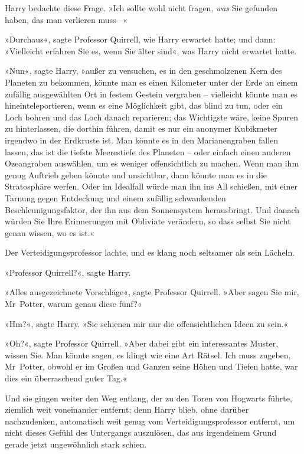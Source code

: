 {Harry bedachte diese Frage. »Ich sollte wohl nicht fragen, \emph{was} Sie gefunden haben, das man verlieren muss --«

»Durchaus«, sagte Professor Quirrell, wie Harry erwartet hatte; und dann: »Vielleicht erfahren Sie es, wenn Sie älter sind«, was Harry nicht erwartet hatte.

»Nun«, sagte Harry, »außer zu versuchen, es in den geschmolzenen Kern des Planeten zu bekommen, könnte man es einen Kilometer unter der Erde an einem zufällig ausgewählten Ort in festem Gestein vergraben -- vielleicht könnte man es hineinteleportieren, wenn es eine Möglichkeit gibt, das blind zu tun, oder ein Loch bohren und das Loch danach reparieren; das Wichtigste wäre, keine Spuren zu hinterlassen, die dorthin führen, damit es nur ein anonymer Kubikmeter irgendwo in der Erdkruste ist. Man könnte es in den Marianengraben fallen lassen, das ist die tiefste Meerestiefe des Planeten -- oder einfach einen anderen Ozeangraben auswählen, um es weniger offensichtlich zu machen. Wenn man ihm genug Auftrieb geben könnte und unsichtbar, dann könnte man es in die Stratosphäre werfen. Oder im Idealfall würde man ihn ins All schießen, mit einer Tarnung gegen Entdeckung und einem zufällig schwankenden Beschleunigungsfaktor, der ihn aus dem Sonnensystem herausbringt. Und danach würden Sie Ihre Erinnerungen mit Obliviate verändern, so dass selbst Sie nicht genau wissen, wo es ist.«

Der Verteidigungsprofessor lachte, und es klang noch seltsamer als sein Lächeln.

»Professor Quirrell?«, sagte Harry.

»Alles ausgezeichnete Vorschläge«, sagte Professor Quirrell. »Aber sagen Sie mir, Mr~Potter, warum genau diese fünf?«

»Hm?«, sagte Harry. »Sie schienen mir nur die offensichtlichen Ideen zu sein.«

»Oh?«, sagte Professor Quirrell. »Aber dabei gibt ein interessantes Muster, wissen Sie. Man könnte sagen, es klingt wie eine Art Rätsel. Ich muss zugeben, Mr~Potter, obwohl er im Großen und Ganzen seine Höhen und Tiefen hatte, war dies ein überraschend guter Tag.«

Und sie gingen weiter den Weg entlang, der zu den Toren von Hogwarts führte, ziemlich weit voneinander entfernt; denn Harry blieb, ohne darüber nachzudenken, automatisch weit genug vom Verteidigungsprofessor entfernt, um nicht dieses Gefühl des Untergangs auszulösen, das aus irgendeinem Grund gerade jetzt ungewöhnlich stark schien.

}
